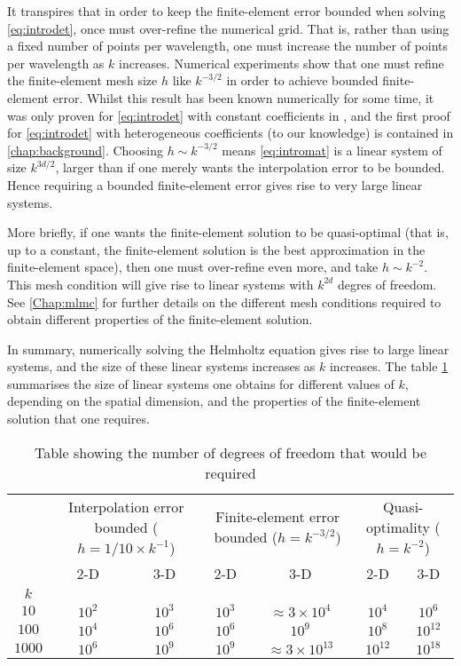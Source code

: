 It transpires that in order to keep the finite-element error bounded when solving \eqref{eq:introdet}, once must over-refine the numerical grid. That is, rather than using a fixed number of points per wavelength, one must increase the number of points per wavelength as $k$ increases. Numerical experiments show that one must refine the finite-element mesh size $h$ like $k^{-3/2}$ in order to achieve bounded finite-element error. Whilst this result has been known numerically for some time, it was only proven for \eqref{eq:introdet} with constant coefficients in \cite{Wu:11}, and the first proof for \eqref{eq:introdet} with heterogeneous coefficients (to our knowledge) is contained in \cref{chap:background}. Choosing $h \sim k^{-3/2}$ means \eqref{eq:intromat} is a linear system of size $k^{3d/2}$, larger than if one merely wants the interpolation error to be bounded. Hence requiring a bounded finite-element error gives rise to very large linear systems.

More briefly, if one wants the finite-element solution to be quasi-optimal (that is, up to a constant, the finite-element solution is the best approximation in the finite-element space), then one must over-refine even more, and take $h \sim k^{-2}$. This mesh condition will give rise to linear systems with $k^{2d}$ degres of freedom. See \cref{Chap:mlmc} for further details on the different mesh conditions required to obtain different properties of the finite-element solution.

In summary, numerically solving the Helmholtz equation gives rise to large linear systems, and the size of these linear systems increases as $k$ increases. The table \cref{tab:introlinsys} summarises the size of linear systems one obtains for different values of $k$, depending on the spatial dimension, and the properties of the finite-element solution that one requires.
\begin{table}
\begin{tabular}{c|cccccc}
&\multicolumn{2}{c}{Interpolation error bounded ($h = 1/10 \times k^{-1}$)}&\multicolumn{2}{c}{Finite-element error bounded ($h = k^{-3/2}$)}&\multicolumn{2}{c}{Quasi-optimality ($h = k^{-2}$)}\\
&2-D&3-D&2-D&3-D&2-D&3-D\\
\hline
$k$&&&&&&\\
$10$&$10^2$&$10^3$&$10^3$&$\approx 3 \times 10^4$&$10^4$&$10^6$\\
$100$&$10^4$&$10^6$&$10^6$&$10^9$&$10^8$&$10^{12}$\\
$1000$&$10^6$&$10^9$&$10^9$&$\approx 3 \times 10^{13}$&$10^{12}$&$10^{18}$
\end{tabular}
\caption{\label{tab:introlinsys}Table showing the number of degrees of freedom that would be required }
\end{table}

